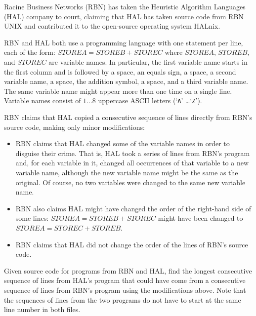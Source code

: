 Racine Business Networks (RBN) has taken the Heuristic Algorithm Languages (HAL) company to court, claiming that HAL has taken source code from RBN UNIX and contributed it to the open-source operating system HALnix.

RBN and HAL both use a programming language with one statement per line, each of the form: $STOREA = STOREB + STOREC$ where $STOREA$, $STOREB$, and $STOREC$ are variable names. In particular, the first variable name starts in the first column and is followed by a space, an equals sign, a space, a second variable name, a space, the addition symbol, a space, and a third variable name. The same variable name might appear more than one time on a single line. Variable names consist of $1 \ldots 8$ uppercase
ASCII letters (`\texttt{A}' \ldots `\texttt{Z}').

RBN claims that HAL copied a consecutive sequence of lines directly from RBN's source code, making only minor modifications:

\begin{itemize}
\item RBN claims that HAL changed some of the variable names in order to disguise their crime. That is, HAL took a series of lines from RBN's program and, for each variable in it, changed all occurrences of that variable to a new variable name, although the new variable name might be the same as the original. Of course, no two variables were changed to the same new variable name.

\item RBN also claims HAL might have changed the order of the right-hand side of some lines: $STOREA = STOREB + STOREC$ might have been changed to $STOREA = STOREC + STOREB$.

\item RBN claims that HAL did not change the order of the lines of RBN's source code.
\end{itemize}

Given source code for programs from RBN and HAL, find the longest consecutive sequence of lines from HAL's program that could have come from a consecutive sequence of lines from RBN's program using the modifications above. Note that the sequences of lines from the two programs do not have to start at the same line number in both files.